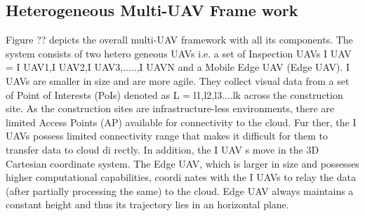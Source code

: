 \documentclass[a0,portrait ] {article}
\begin{document}
\begin{multicols}{2}
 \section{Heterogeneous Multi-UAV Frame work} \label{sec:3}
 Figure ?? depicts the overall multi-UAV framework with
 all its components. The system consists of two hetero
geneous UAVs i.e. a set of Inspection UAVs I UAV =
 {I UAV1,I UAV2,I UAV3,.....,I UAVN} and a Mobile
 Edge UAV (Edge UAV). I UAVs are smaller in size and
 are more agile. They collect visual data from a set of
 Point of Interests (PoIs) denoted as L = {l1,l2,l3....lk}
 across the construction site. As the construction sites are
 infrastructure-less environments, there are limited Access
 Points (AP) available for connectivity to the cloud. Fur
ther, the I UAVs possess limited connectivity range that
 makes it difficult for them to transfer data to cloud di
rectly. In addition, the I UAV s move in the 3D Cartesian
 coordinate system. The Edge UAV, which is larger in size
 and possesses higher computational capabilities, coordi
nates with the I UAVs to relay the data (after partially
 processing the same) to the cloud. Edge UAV always
 maintains a constant height and thus its trajectory lies in
 an horizontal plane.


\cite{mozaffari2019tutorial}
\cite{ruggiero2018aerial}
\cite{boursianis2020internet}
\cite{waharte2010supporting}
\cite{hamledari2018uav}
\cite{mao2017survey}
\cite{golparvar2011integrated}
\cite{nguyen2020towards}
\cite{wan2019towards}
\cite{abbas2017mobile}
\cite{neely2010stochastic}
\cite{zhang2018stochastic}
\cite{al2014optimal}
\cite{lu2018beyond}
\cite{MichelNeeley2018}
\cite{}



\end{multicols}

 
\end{document}
